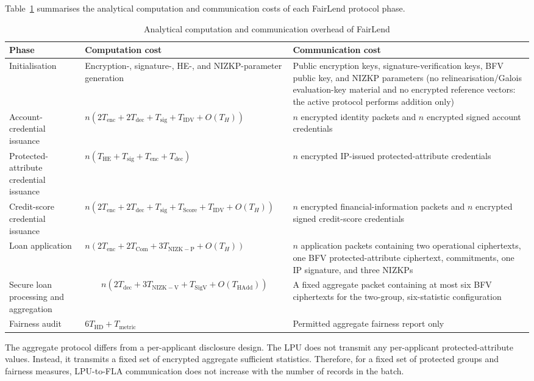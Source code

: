 \documentclass[a4paper,fleqn]{cas-dc}
\begin{document}
Table~\ref{tab:overhead} summarises the analytical computation and communication costs of each FairLend protocol phase.

\begin{table}[htbp] 
\centering 
\caption{Analytical computation and communication overhead of FairLend} 
\label{tab:overhead} \scriptsize \begin{tabular}{|p{2.8cm}|p{6.2cm}|p{5.1cm}|} \hline \textbf{Phase} & \textbf{Computation cost} & \textbf{Communication cost} \\ \hline Initialisation & Encryption-, signature-, HE-, and NIZKP-parameter generation & Public encryption keys, signature-verification keys, BFV public key, and NIZKP parameters (no relinearisation/Galois evaluation-key material and no encrypted reference vectors: the active protocol performs addition only) \\ \hline Account-credential issuance & $n(2T_{\mathrm{enc}}+2T_{\mathrm{dec}} +T_{\mathrm{sig}}+T_{\mathrm{IDV}}+O(T_H))$ & $n$ encrypted identity packets and $n$ encrypted signed account credentials \\ \hline Protected-attribute credential issuance & $n(T_{\mathrm{HE}}+T_{\mathrm{sig}} +T_{\mathrm{enc}}+T_{\mathrm{dec}})$ & $n$ encrypted IP-issued protected-attribute credentials \\ \hline Credit-score credential issuance & $n(2T_{\mathrm{enc}}+2T_{\mathrm{dec}} +T_{\mathrm{sig}}+T_{\mathrm{Score}}+T_{\mathrm{IDV}}+O(T_H))$ & $n$ encrypted financial-information packets and $n$ encrypted signed credit-score credentials \\ \hline Loan application & $n(2T_{\mathrm{enc}}+2T_{\mathrm{Com}} +3T_{\mathrm{NIZK-P}}+O(T_H))$ & $n$ application packets containing two operational ciphertexts, one BFV protected-attribute ciphertext, commitments, one IP signature, and three NIZKPs \\ \hline Secure loan processing and aggregation & \[ n\left( 2T_{\mathrm{dec}} +3T_{\mathrm{NIZK-V}} +T_{\mathrm{SigV}} +O(T_{\mathrm{HAdd}}) \right) \] & A fixed aggregate packet containing at most six BFV ciphertexts for the two-group, six-statistic configuration \\ \hline Fairness audit & $6T_{\mathrm{HD}}+T_{\mathrm{metric}}$ & Permitted aggregate fairness report only \\ \hline \end{tabular} \end{table}

The aggregate protocol differs from a per-applicant disclosure design. The LPU does not transmit any per-applicant protected-attribute values. Instead, it transmits a fixed set of encrypted aggregate sufficient statistics. Therefore, for a fixed set of protected groups and fairness measures, LPU-to-FLA communication does not increase with the number of records in the batch.
\end{document}
